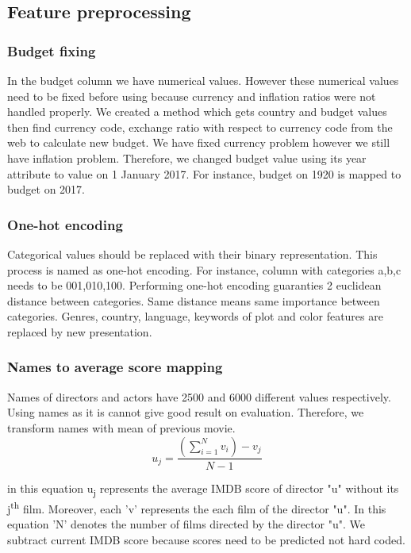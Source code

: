 \documentclass{article}
\begin{document}
\subsection{Feature preprocessing}
\subsubsection{Budget fixing}
In the budget column we have numerical values. However these numerical values need to be fixed before using because currency and inflation ratios were not handled properly.  We created a method which gets country and budget values then find currency code, exchange ratio with respect to currency code from the web to calculate new budget. We have fixed currency problem however we still have inflation problem. Therefore, we changed budget value using its year attribute to value on 1 January 2017. For instance, budget on 1920 is mapped to budget on 2017.

\subsubsection{One-hot encoding}
Categorical values should be replaced with their binary representation. This process is named as one-hot encoding. For instance, column with categories a,b,c needs to be 001,010,100. Performing one-hot encoding guaranties 2 euclidean distance between categories. Same distance means same importance between categories. Genres, country, language, keywords of plot and color features are replaced by new presentation.
\subsubsection{Names to average score mapping}
Names of directors and actors have 2500 and 6000 different values respectively. Using names as it is cannot give good result on evaluation. Therefore, we transform names with mean of previous movie.
\begin{equation}
	u_j=\frac {(\sum\limits_{i=1}^{N} v_i) - v_j}{N-1}
\end{equation}

in this equation u\textsubscript{j} represents the average IMDB score of director "u" without its j\textsuperscript{th} film. Moreover, each 'v' represents the each film of the director "u". In this equation 'N' denotes the number of films directed by the director "u". We subtract current IMDB score because scores need to be predicted not hard coded.
\end{document}
